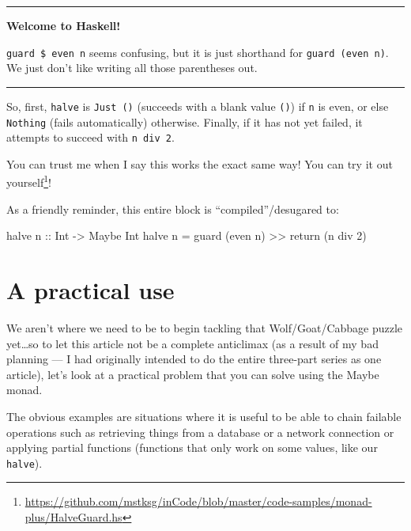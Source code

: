 \documentclass[]{article}
\newenvironment{Shaded}{}{}
\newcommand{\DataTypeTok}[1]{\textcolor[rgb]{0.56,0.13,0.00}{#1}}
\newcommand{\DecValTok}[1]{\textcolor[rgb]{0.25,0.63,0.44}{#1}}
\newcommand{\FunctionTok}[1]{\textcolor[rgb]{0.02,0.16,0.49}{#1}}
\newcommand{\NormalTok}[1]{#1}
\newcommand{\OperatorTok}[1]{\textcolor[rgb]{0.40,0.40,0.40}{#1}}
\newcommand{\OtherTok}[1]{\textcolor[rgb]{0.00,0.44,0.13}{#1}}
\renewcommand{\href}[2]{#2\footnote{\url{#1}}}
\begin{document}
\begin{center}\rule{0.5\linewidth}{0.5pt}\end{center}

\textbf{Welcome to Haskell!}

\texttt{guard\ \$\ even\ n} seems confusing, but it is just shorthand for
\texttt{guard\ (even\ n)}. We just don't like writing all those parentheses out.

\begin{center}\rule{0.5\linewidth}{0.5pt}\end{center}

So, first, \texttt{halve} is \texttt{Just\ ()} (succeeds with a blank value
\texttt{()}) if \texttt{n} is even, or else \texttt{Nothing} (fails
automatically) otherwise. Finally, if it has not yet failed, it attempts to
succeed with \texttt{n\ \textasciigrave{}div\textasciigrave{}\ 2}.

You can trust me when I say this works the exact same way! You can
\href{https://github.com/mstksg/inCode/blob/master/code-samples/monad-plus/HalveGuard.hs}{try
it out yourself}!

As a friendly reminder, this entire block is ``compiled''/desugared to:

\begin{Shaded}
\begin{Highlighting}[]
\NormalTok{halve}\OtherTok{ n ::} \DataTypeTok{Int} \OtherTok{{-}\textgreater{}} \DataTypeTok{Maybe} \DataTypeTok{Int}
\NormalTok{halve n }\OtherTok{=}\NormalTok{ guard (}\FunctionTok{even}\NormalTok{ n) }\OperatorTok{\textgreater{}\textgreater{}} \FunctionTok{return}\NormalTok{ (n }\OtherTok{\textasciigrave{}div\textasciigrave{}} \DecValTok{2}\NormalTok{)}
\end{Highlighting}
\end{Shaded}

\section{A practical use}\label{a-practical-use}

We aren't where we need to be to begin tackling that Wolf/Goat/Cabbage puzzle
yet\ldots so to let this article not be a complete anticlimax (as a result of my
bad planning --- I had originally intended to do the entire three-part series as
one article), let's look at a practical problem that you can solve using the
Maybe monad.

The obvious examples are situations where it is useful to be able to chain
failable operations such as retrieving things from a database or a network
connection or applying partial functions (functions that only work on some
values, like our \texttt{halve}).
\end{document}
